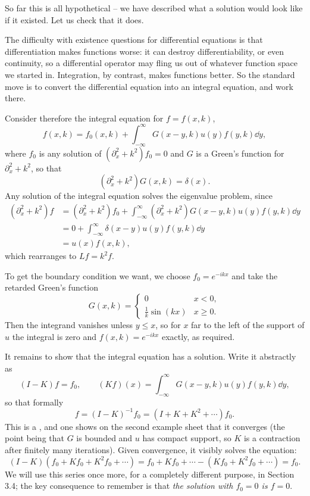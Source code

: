 \documentclass[a4paper]{scrartcl}
\begin{document}
So far this is all hypothetical -- we have described what a solution would look like if it existed. Let us check that it does.

The difficulty with existence questions for differential equations is that differentiation makes functions worse: it can destroy differentiability, or even continuity, so a differential operator may fling us out of whatever function space we started in. Integration, by contrast, makes functions better. So the standard move is to convert the differential equation into an integral equation, and work there.

Consider therefore the integral equation for $f = f(x,k)$,
$$
f(x,k) = f_0(x,k) + \int_{-\infty}^\infty G(x-y,k)u(y)f(y,k)\dd y,
$$
where $f_0$ is any solution of $(\partial_x^2 + k^2)f_0 = 0$ and $G$ is a Green's function for $\partial_x^2 + k^2$, so that
$$
(\partial_x^2 + k^2)G(x,k) = \delta(x).
$$
Any solution of the integral equation solves the eigenvalue problem, since
\begin{align*}
	(\partial_x^2+k^2)f &= (\partial_x^2+k^2)f_0 + \int_{-\infty}^\infty(\partial_x^2+k^2)G(x-y,k)u(y)f(y,k)\dd y\\
	&= 0 + \int_{-\infty}^\infty\delta(x-y)u(y)f(y,k)\dd y\\
	&= u(x)f(x,k),
\end{align*}
which rearranges to $Lf = k^2f$.

To get the boundary condition we want, we choose $f_0 = e^{-ikx}$ and take the retarded Green's function
$$
G(x,k) = \begin{cases}0 & x<0,\\ \frac{1}{k}\sin(kx) & x\ge 0.\end{cases}
$$
Then the integrand vanishes unless $y \le x$, so for $x$ far to the left of the support of $u$ the integral is zero and $f(x,k) = e^{-ikx}$ exactly, as required.

It remains to show that the integral equation has a solution. Write it abstractly as
$$
(I - K)f = f_0, \qquad (Kf)(x) = \int_{-\infty}^\infty G(x-y,k)u(y)f(y,k)\dd y,
$$
so that formally
$$
f = (I-K)^{-1}f_0 = \left(I + K + K^2 + \cdots\right)f_0.
$$
This is a , and one shows on the second example sheet that it converges (the point being that $G$ is bounded and $u$ has compact support, so $K$ is a contraction after finitely many iterations). Given convergence, it visibly solves the equation:
$$
(I-K)\left(f_0 + Kf_0 + K^2f_0+\cdots\right) = f_0 + Kf_0 + \cdots - \left(Kf_0 + K^2f_0 + \cdots\right) = f_0.
$$
We will use this series once more, for a completely different purpose, in Section 3.4; the key consequence to remember is that \emph{the solution with $f_0 = 0$ is $f = 0$}.
\end{document}
